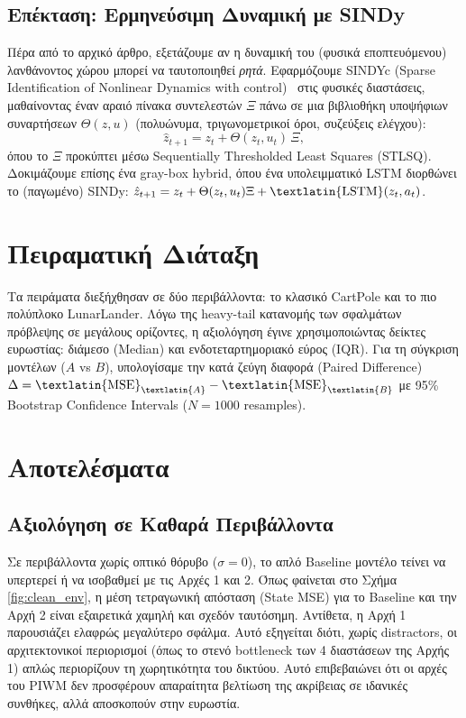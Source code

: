 \documentclass[conference, a4paper]{IEEEtran}
\begin{document}
\subsection{\textbf{Επέκταση: Ερμηνεύσιμη Δυναμική με \textlatin{SINDy}}}
Πέρα από το αρχικό άρθρο, εξετάζουμε αν η δυναμική του (φυσικά εποπτευόμενου) λανθάνοντος χώρου μπορεί να ταυτοποιηθεί \emph{ρητά}. Εφαρμόζουμε \textlatin{SINDYc} (\textlatin{Sparse Identification of Nonlinear Dynamics with control})~\cite{sindy} στις φυσικές διαστάσεις, μαθαίνοντας έναν αραιό πίνακα συντελεστών $\Xi$ πάνω σε μια βιβλιοθήκη υποψήφιων συναρτήσεων $\Theta(z,u)$ (πολυώνυμα, τριγωνομετρικοί όροι, συζεύξεις ελέγχου):
\begin{equation}
    \hat{z}_{t+1} = z_t + \Theta(z_t, u_t)\,\Xi ,
\end{equation}
όπου το $\Xi$ προκύπτει μέσω \textlatin{Sequentially Thresholded Least Squares} (\textlatin{STLSQ}). Δοκιμάζουμε επίσης ένα \textlatin{gray-box hybrid}, όπου ένα υπολειμματικό \textlatin{LSTM} διορθώνει το (παγωμένο) \textlatin{SINDy}: $\hat{z}_{t+1} = z_t + \Theta(z_t,u_t)\Xi + \text{\textlatin{LSTM}}(z_t,a_t)$.

\section{\textbf{Πειραματική Διάταξη}}
\label{sec:setup}

Τα πειράματα διεξήχθησαν σε δύο περιβάλλοντα: το κλασικό \textlatin{CartPole} και το πιο πολύπλοκο \textlatin{LunarLander}.
Λόγω της \textlatin{heavy-tail} κατανομής των σφαλμάτων πρόβλεψης σε μεγάλους ορίζοντες, η αξιολόγηση έγινε χρησιμοποιώντας δείκτες ευρωστίας: διάμεσο (\textlatin{Median}) και ενδοτεταρτημοριακό εύρος (\textlatin{IQR}). Για τη σύγκριση μοντέλων ($A$ vs $B$), υπολογίσαμε την κατά ζεύγη διαφορά (\textlatin{Paired Difference}) $\Delta = \text{\textlatin{MSE}}_{\textlatin{A}} - \text{\textlatin{MSE}}_{\textlatin{B}}$ με 95\% \textlatin{Bootstrap Confidence Intervals} ($N=1000$ \textlatin{resamples}).

\section{\textbf{Αποτελέσματα}}
\label{sec:results}

\subsection{\textbf{Αξιολόγηση σε Καθαρά Περιβάλλοντα}}
Σε περιβάλλοντα χωρίς οπτικό θόρυβο ($\sigma=0$), το απλό \textlatin{Baseline} μοντέλο τείνει να υπερτερεί ή να ισοβαθμεί με τις Αρχές 1 και 2. Όπως φαίνεται στο Σχήμα \ref{fig:clean_env}, η μέση τετραγωνική απόσταση (\textlatin{State MSE}) για το \textlatin{Baseline} και την Αρχή 2 είναι εξαιρετικά χαμηλή και σχεδόν ταυτόσημη. Αντίθετα, η Αρχή 1 παρουσιάζει ελαφρώς μεγαλύτερο σφάλμα. Αυτό εξηγείται διότι, χωρίς \textlatin{distractors}, οι αρχιτεκτονικοί περιορισμοί (όπως το στενό \textlatin{bottleneck} των 4 διαστάσεων της Αρχής 1) απλώς περιορίζουν τη χωρητικότητα του δικτύου. Αυτό επιβεβαιώνει ότι οι αρχές του \textlatin{PIWM} δεν προσφέρουν απαραίτητα βελτίωση της ακρίβειας σε ιδανικές συνθήκες, αλλά αποσκοπούν στην ευρωστία.
\end{document}
